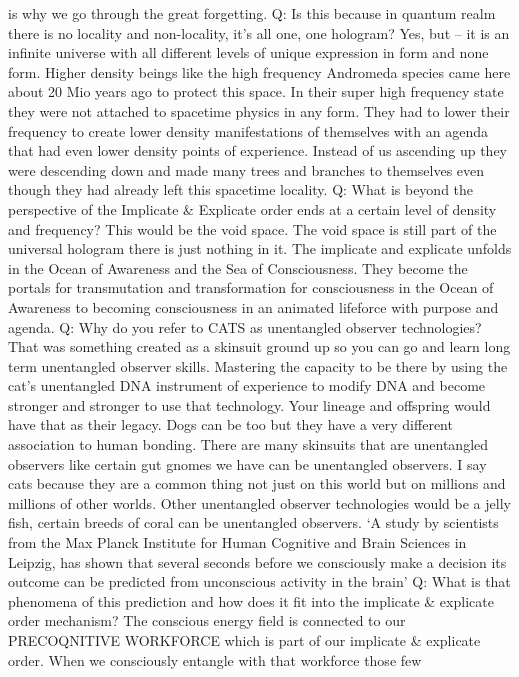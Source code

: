 is why we go through the great forgetting. Q: Is this because in quantum
realm there is no locality and non-locality, it's all one, one hologram?
Yes, but -- it is an infinite universe with all different levels of
unique expression in form and none form. Higher density beings like the
high frequency Andromeda species came here about 20 Mio years ago to
protect this space. In their super high frequency state they were not
attached to spacetime physics in any form. They had to lower their
frequency to create lower density manifestations of themselves with an
agenda that had even lower density points of experience. Instead of us
ascending up they were descending down and made many trees and branches
to themselves even though they had already left this spacetime locality.
Q: What is beyond the perspective of the Implicate \& Explicate order
ends at a certain level of density and frequency? This would be the void
space. The void space is still part of the universal hologram there is
just nothing in it. The implicate and explicate unfolds in the Ocean of
Awareness and the Sea of Consciousness. They become the portals for
transmutation and transformation for consciousness in the Ocean of
Awareness to becoming consciousness in an animated lifeforce with
purpose and agenda. Q: Why do you refer to CATS as unentangled observer
technologies? That was something created as a skinsuit ground up so you
can go and learn long term unentangled observer skills. Mastering the
capacity to be there by using the cat's unentangled DNA instrument of
experience to modify DNA and become stronger and stronger to use that
technology. Your lineage and offspring would have that as their legacy.
Dogs can be too but they have a very different association to human
bonding. There are many skinsuits that are unentangled observers like
certain gut gnomes we have can be unentangled observers. I say cats
because they are a common thing not just on this world but on millions
and millions of other worlds. Other unentangled observer technologies
would be a jelly fish, certain breeds of coral can be unentangled
observers. `A study by scientists from the Max Planck Institute for
Human Cognitive and Brain Sciences in Leipzig, has shown that several
seconds before we consciously make a decision its outcome can be
predicted from unconscious activity in the brain' Q: What is that
phenomena of this prediction and how does it fit into the implicate \&
explicate order mechanism? The conscious energy field is connected to
our PRECOQNITIVE WORKFORCE which is part of our implicate \& explicate
order. When we consciously entangle with that workforce those few
